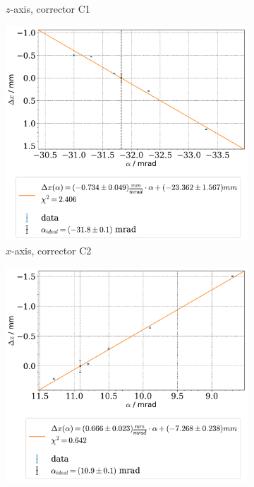 \documentclass[11pt,a4paper,notitlepage]{scrartcl}
\begin{document}
\begin{figure}
\begin{subfigure}{.49\linewidth}
		\caption{$z$-axis, corrector C1}
	\end{subfigure}
		\begin{subfigure}{.49\linewidth}
		\includegraphics[width=\linewidth]{figs/calibration/q3_x.pdf}
		\caption{$x$-axis, corrector C2}
	\end{subfigure}
	\begin{subfigure}{.49\linewidth}
		\includegraphics[width=\linewidth]{figs/calibration/q3_z.pdf}

\end{subfigure}
\end{figure}
\end{document}
